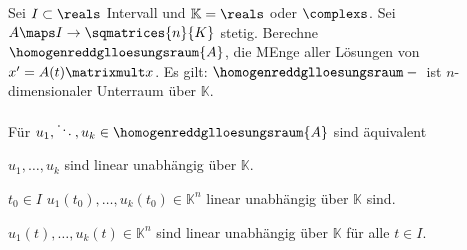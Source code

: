 \begin{satz}\label{homogene_dgl_loesungsraum}
  Sei \( I\subset \reals \) Intervall und \( \mathbb{K}=\reals \) oder \( \complexs \). Sei \( A\maps I\to \sqmatrices{n}{K} \) stetig. Berechne \( \homogenreddglloesungsraum{A} \), die MEnge aller Lösungen von \( x'=A(t)\matrixmult x \). Es gilt: \( \homogenreddglloesungsraum-{} \) ist \( n \)-dimensionaler Unterraum über \( \mathbb{K} \).

  Für \( u_1,\ddots,u_k\in \homogenreddglloesungsraum{A} \) sind äquivalent
  \begin{eigenschaftenenumerate}
    \item \label{homogene_dgl_loesungsraum:loesungen_unabhaengig}\( u_1,\dotsc,u_k \) sind linear unabhängig über \( \mathbb{K} \).
    \item \label{homogene_dgl_loesungsraum:loesungen_unabhaengig_fuer_einen_wert} \texists \( t_0\in I \) \sd \( u_1(t_0),\dotsc,u_k(t_0)\in \mathbb{K}^n \) linear unabhängig über \( \mathbb{K} \) sind.
    \item \label{homogene_dgl_loesungsraum:loesungen_unabhaengig_fuer_alle_werte}\( u_1(t),\dotsc,u_k(t)\in \mathbb{K}^n \) sind linear unabhängig über \( \mathbb{K} \) für alle \( t\in I \).
  \end{eigenschaftenenumerate}
\end{satz}
